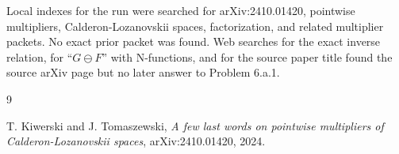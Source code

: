 \documentclass[11pt]{article}
\newcommand{\om}{\ominus}
\begin{document}
Local indexes for the run were searched for arXiv:2410.01420, pointwise
multipliers, Calderon-Lozanovskii spaces, factorization, and related multiplier
packets. No exact prior packet was found. Web searches for the exact inverse
relation, for ``$G\om F$'' with N-functions, and for the source paper title
found the source arXiv page but no later answer to Problem 6.a.1.

\begin{thebibliography}{9}

T. Kiwerski and J. Tomaszewski,
\emph{A few last words on pointwise multipliers of Calderon-Lozanovskii spaces},
arXiv:2410.01420, 2024.

\end{thebibliography}
\end{document}
